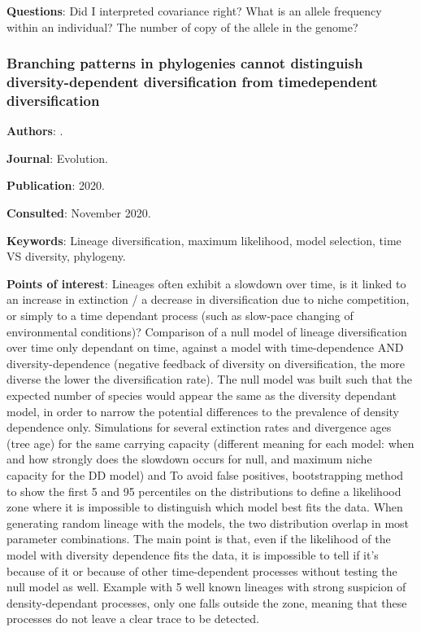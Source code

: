 \documentclass[12pt,a4paper]{article}
\begin{document}
\textbf{Questions}: Did I interpreted covariance right? What is an allele frequency within an individual? The number of copy of the allele in the genome?

\newpage

\subsubsection*{Branching patterns in phylogenies cannot distinguish diversity-dependent diversification from timedependent diversification}

\textbf{Authors}: \cite{pannetier2020branching}.

\textbf{Journal}: Evolution.

\textbf{Publication}: 2020.

\textbf{Consulted}: November 2020.

\textbf{Keywords}: Lineage diversification, maximum likelihood, model selection, time VS diversity, phylogeny.

\textbf{Points of interest}: Lineages often exhibit a slowdown over time, is it linked to an increase in extinction / a decrease in diversification due to niche competition, or simply to a time dependant process (such as slow-pace changing of environmental conditions)? Comparison of a null model of lineage diversification over time only dependant on time, against a model with time-dependence AND diversity-dependence (negative feedback of diversity on diversification, the more diverse the lower the diversification rate). The null model was built such that the expected number of species would appear the same as the diversity dependant model, in order to narrow the potential differences to the prevalence of density dependence only. Simulations for several extinction rates and divergence ages (tree age) for the same carrying capacity (different meaning for each model: when and how strongly does the slowdown occurs for null, and maximum niche capacity for the DD model) and
To avoid false positives, bootstrapping method to show the first 5 and 95 percentiles on the distributions to define a likelihood zone where it is impossible to distinguish which model best fits the data.
When generating random lineage with the models, the two distribution overlap in most parameter combinations.
The main point is that, even if the likelihood of the model with diversity dependence fits the data, it is impossible to tell if it's because of it or because of other time-dependent processes without testing the null model as well.
Example with 5 well known lineages with strong suspicion of density-dependant processes, only one falls outside the zone, meaning that these processes do not leave a clear trace to be detected.
\end{document}
